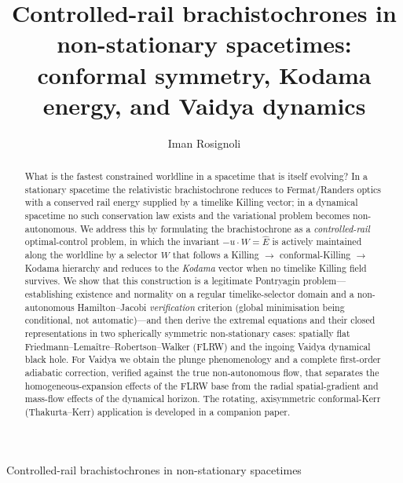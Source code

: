 \documentclass[12pt]{iopart}
\newcommand{\Ehat}{\hat E}
\begin{document}
\title{Controlled-rail brachistochrones in non-stationary spacetimes:
conformal symmetry, Kodama energy, and Vaidya dynamics}

\author{Iman Rosignoli}
\address{Department of Physics, University of Pavia, Via A.\ Bassi 6, 27100 Pavia, Italy}

\begin{abstract}
What is the fastest constrained worldline in a spacetime that is itself evolving? In a
stationary spacetime the relativistic brachistochrone reduces to Fermat/Randers optics
with a conserved rail energy supplied by a timelike Killing vector; in a dynamical
spacetime no such conservation law exists and the variational problem becomes
non-autonomous. We address this by formulating the brachistochrone as a
\emph{controlled-rail} optimal-control problem, in which the invariant $-u\cdot W=\Ehat$ is
actively maintained along the worldline by a selector $W$ that follows a Killing $\to$
conformal-Killing $\to$ Kodama hierarchy and reduces to the \emph{Kodama} vector when no
timelike Killing field survives. We show that this construction is a legitimate
Pontryagin problem---establishing existence and normality on a regular timelike-selector
domain and a non-autonomous Hamilton--Jacobi \emph{verification} criterion (global
minimisation being conditional, not automatic)---and then derive the extremal equations
and their closed representations in two spherically symmetric non-stationary cases:
spatially flat Friedmann--Lema\^itre--Robertson--Walker (FLRW) and the ingoing Vaidya
dynamical black hole. For Vaidya we obtain the plunge phenomenology and a complete
first-order adiabatic correction, verified against the true non-autonomous flow, that
separates the homogeneous-expansion effects of the FLRW base from the radial
spatial-gradient and mass-flow effects of the dynamical horizon. The rotating,
axisymmetric conformal-Kerr (Thakurta--Kerr)
application is developed in a companion paper.
\end{abstract}

\maketitle
%
         {Controlled-rail brachistochrones in non-stationary spacetimes}
\end{document}
